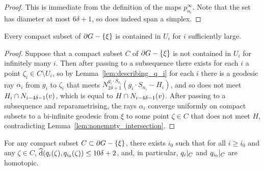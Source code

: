 \documentclass[a4paper]{article}
\begin{document}
\begin{proof}
  This is immediate from the definition of the maps $p^\infty_{n_i}$. Note that
  the set has diameter at most $6\delta+1$, so does indeed span a simplex.
\end{proof}

\begin{lemma}
  Every compact subset of $\partial G - \left\{\xi\right\}$ is contained in $U_i$ for 
  $i$ sufficiently large.
\end{lemma} 

\begin{proof}
  Suppose that a compact subset $C$ of $\partial G - \left\{\xi\right\}$ is not contained
  in $U_i$ for infinitely many $i$. Then after passing to a subsequence there
  exists for each $i$ a point $\zeta_i \in C\setminus U_i$, so by
  Lemma~\ref{lem:describing_q_i} for each $i$ there is a geodesic ray
  $\alpha_i$ from $g_i$ to $\zeta_i$ that meets $N_{2\delta+1}^{g_i\cdot
  S_{n_i}}(g_i\cdot S_{n_i} - H_i)$, and so does not meet $H_i\cap
  N_{i-4\delta-1}(v)$, which is equal to $H \cap N_{i-4\delta-1}(v)$.
  After passing to a subsequence and reparametrising, the rays $\alpha_i$
  converge uniformly on compact subsets to a bi-infinite geodesic from $\xi$ to
  some point $\zeta \in C$ that does not meet $H$, contradicting
  Lemma~\ref{lem:nonempty_intersection}.
\end{proof}

\begin{lemma}\label{lem:affinehomotopic}
  For any compact subset $C\subset\partial G - \left\{\xi\right\}$, there exists $i_0$ 
  such that for all $i \geq i_0$ and any $\zeta \in C$, $\operatorname{\widehat{d}}(q_i(\zeta),
  q_{i_0}(\zeta)) \leq 10\delta + 2$, and, in particular, $q_i\vert_{C}$
  and $q_{i_0}\vert_{C}$ are homotopic.
\end{lemma}
\end{document}
